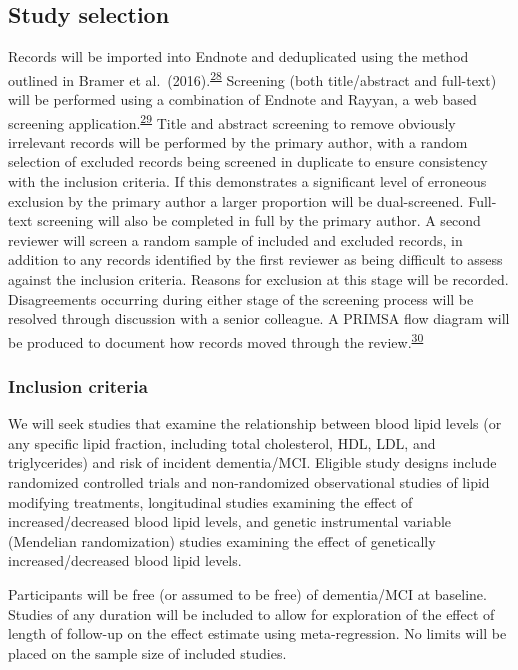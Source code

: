 \documentclass[a4paper, twoside]{templates/ociamthesis}
\begin{document}
\hypertarget{study-selection}{%
\subsection{Study selection}\label{study-selection}}

Records will be imported into Endnote and deduplicated using the method outlined in Bramer et al.~(2016).\textsuperscript{\protect\hyperlink{ref-bramer2016}{28}} Screening (both title/abstract and full-text) will be performed using a combination of Endnote and Rayyan, a web based screening application.\textsuperscript{\protect\hyperlink{ref-ouzzani2016}{29}} Title and abstract screening to remove obviously irrelevant records will be performed by the primary author, with a random selection of excluded records being screened in duplicate to ensure consistency with the inclusion criteria. If this demonstrates a significant level of erroneous exclusion by the primary author a larger proportion will be dual-screened. Full-text screening will also be completed in full by the primary author. A second reviewer will screen a random sample of included and excluded records, in addition to any records identified by the first reviewer as being difficult to assess against the inclusion criteria. Reasons for exclusion at this stage will be recorded. Disagreements occurring during either stage of the screening process will be resolved through discussion with a senior colleague. A PRIMSA flow diagram will be produced to document how records moved through the review.\textsuperscript{\protect\hyperlink{ref-zotero-766}{30}}

\hypertarget{inclusion-criteria}{%
\subsubsection{Inclusion criteria}\label{inclusion-criteria}}

We will seek studies that examine the relationship between blood lipid levels (or any specific lipid fraction, including total cholesterol, HDL, LDL, and triglycerides) and risk of incident dementia/MCI. Eligible study designs include randomized controlled trials and non-randomized observational studies of lipid modifying treatments, longitudinal studies examining the effect of increased/decreased blood lipid levels, and genetic instrumental variable (Mendelian randomization) studies examining the effect of genetically increased/decreased blood lipid levels.

Participants will be free (or assumed to be free) of dementia/MCI at baseline. Studies of any duration will be included to allow for exploration of the effect of length of follow-up on the effect estimate using meta-regression. No limits will be placed on the sample size of included studies.
\end{document}
